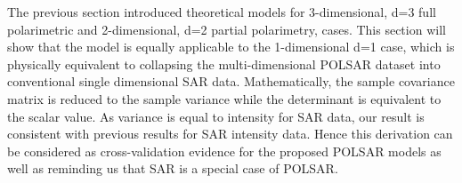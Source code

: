 \documentclass[journal]{IEEEtran}
\begin{document}

The previous section  introduced  theoretical models for 3-dimensional, d=3 full polarimetric and 2-dimensional, d=2 partial polarimetry, cases.
This section will show that the model is equally  applicable to the 1-dimensional d=1 case,
  which is physically equivalent to  collapsing the multi-dimensional POLSAR dataset  into conventional single dimensional SAR data.
Mathematically, the sample covariance matrix is reduced to the sample variance while the determinant is equivalent to  the scalar value.
As variance is equal to intensity for SAR data, our result is consistent with previous results for SAR intensity data.
Hence this derivation can be considered as cross-validation evidence for the proposed POLSAR models
  as well as reminding us that SAR is a special case of POLSAR.
  
\end{document}
